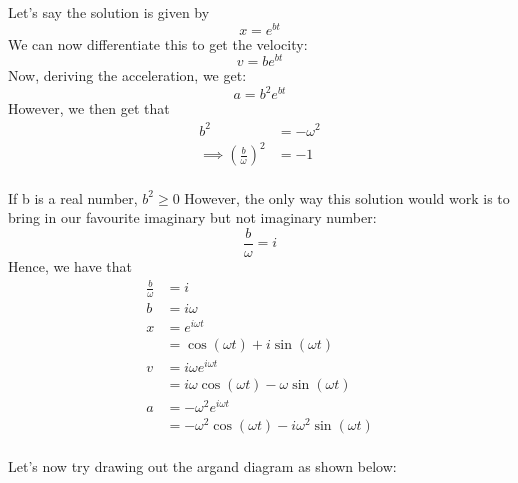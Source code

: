\documentclass[a4paper,12pt,oneside]{book}
\begin{document}
Let's say the solution is given by
\[x = e^{bt} \]
We can now differentiate this to get the velocity:
\[v = b e^{bt} \]
Now, deriving the acceleration, we get:
\[a = b^2 e^{bt} \]
However, we then get that
\begin{align*}
    b^2 &= - \omega^2 \\ \implies \left (\frac{b}{\omega} \right )^2 &= -1
\end{align*} \\
If b is a real number, $b^2 \geq 0$
However, the only way this solution would work is to bring in our favourite imaginary but not imaginary number:
\[\frac{b}{\omega} = i \]
Hence, we have that
\begin{align*}
    \frac{b}{\omega} &= i \\
    b &= i \omega \\
    x &= e ^ { i \omega t } \\
    &= \cos \left ( \omega t \right ) + i \sin \left ( \omega t \right ) \\
    v &= i \omega e ^ { i \omega t } \\
    &= i \omega \cos \left ( \omega t \right ) - \omega \sin \left ( \omega t \right ) \\
    a &= - \omega^2 e ^ { i \omega t } \\
    &= - \omega^2 \cos \left ( \omega t \right ) - i \omega^2 \sin \left ( \omega t \right ) \\
\end{align*}

Let's now try drawing out the argand diagram as shown below:

\begin{center}
\end{center}
\end{document}
